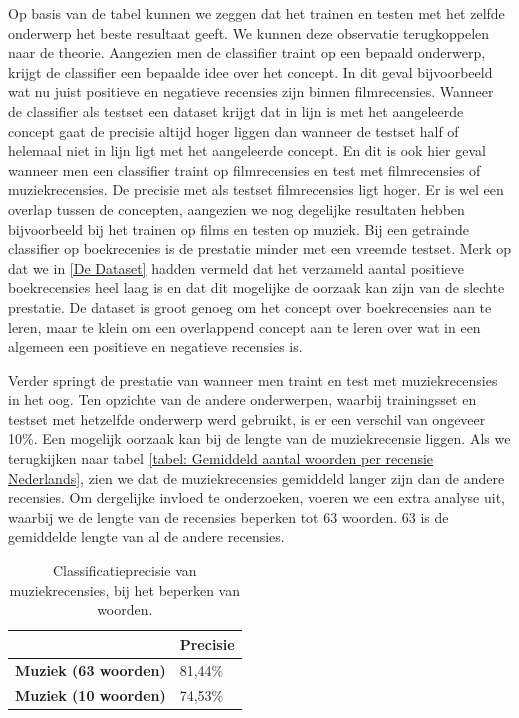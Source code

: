 Op basis van de tabel kunnen we zeggen dat het trainen en testen met het zelfde onderwerp het beste resultaat geeft. We kunnen deze observatie terugkoppelen naar de theorie. Aangezien men de classifier traint op een bepaald onderwerp, krijgt de classifier een bepaalde idee over het concept. In dit geval bijvoorbeeld wat nu juist positieve en negatieve recensies zijn binnen filmrecensies. Wanneer de classifier als testset een dataset krijgt dat in lijn is met het aangeleerde concept gaat de precisie altijd hoger liggen dan wanneer de testset half of helemaal niet in lijn ligt met het aangeleerde concept. En dit is ook hier geval wanneer men een classifier traint op filmrecensies en test met filmrecensies of muziekrecensies. De precisie met als testset filmrecensies ligt hoger. Er is wel een overlap tussen de concepten, aangezien we nog degelijke resultaten hebben bijvoorbeeld bij het trainen op films en testen op muziek. Bij een getrainde classifier op boekrecenies is de prestatie minder met een vreemde testset. Merk op dat we in \ref{De Dataset} hadden vermeld dat het verzameld aantal positieve boekrecensies heel laag is en dat dit mogelijke de oorzaak kan zijn van de slechte prestatie. De dataset is groot genoeg om het concept over boekrecensies aan te leren, maar te klein om een overlappend concept aan te leren over wat in een algemeen een positieve en negatieve recensies is.

Verder springt de prestatie van wanneer men traint en test met muziekrecensies in het oog. Ten opzichte van de andere onderwerpen, waarbij trainingsset en testset met hetzelfde onderwerp werd gebruikt, is er een verschil van ongeveer 10\%. Een mogelijk oorzaak kan bij de lengte van de muziekrecensie liggen. Als we terugkijken naar tabel \ref{tabel: Gemiddeld aantal woorden per recensie Nederlands}, zien we dat de muziekrecensies gemiddeld langer zijn dan de andere recensies. Om dergelijke invloed te onderzoeken, voeren we een extra analyse uit, waarbij we de lengte van de recensies beperken tot 63 woorden. 63 is de gemiddelde lengte van al de andere recensies. \\

\begin{table}[h]
\centering
\begin{tabular}{l|l|}
\cline{2-2}
                                          & {\bf Precisie} \\ \hline
\multicolumn{1}{|l|}{{\bf Muziek (63 woorden)}} & 81,44\%        \\ \hline
\multicolumn{1}{|l|}{{\bf Muziek (10 woorden)}} & 74,53\%        \\ \hline
\end{tabular}
\caption{Classificatieprecisie van muziekrecensies, bij het beperken van woorden.}
\label{muziekrecensies beperking}
\end{table}

